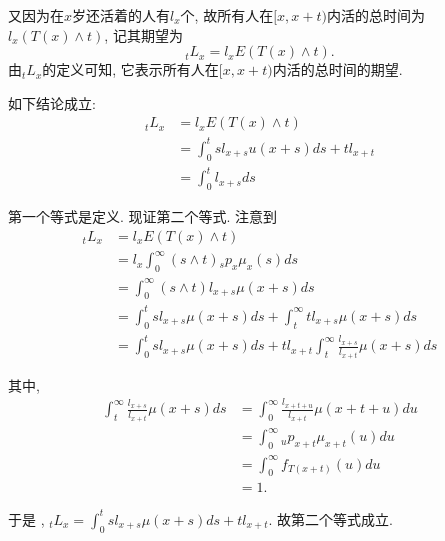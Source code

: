 \documentclass[a4paper,openany, 10pt]{ctexbook}
\begin{document}
又因为在$x$岁还活着的人有$l_x$个, 故所有人在$[x,x+t)$内活的总时间为$l_x(T(x)\wedge t)$, 记其期望为$$ {}_tL_x=l_xE(T(x)\wedge t).$$
由${}_tL_x$的定义可知, 它表示所有人在$[x,x+t)$内活的总时间的期望.
\begin{proposition} 如下结论成立:
    \begin{align*}
        {}_tL_x & =l_xE(T(x)\wedge t)                 \\
                & =\int_0^t sl_{x+s}u(x+s)ds+tl_{x+t} \\
                & =\int_0^tl_{x+s}ds
    \end{align*}
\end{proposition}
\proof 第一个等式是定义. 现证第二个等式. 注意到
\begin{align*}
    {}_tL_x & =l_xE(T(x)\wedge t)                                                                  \\
            & =l_x\int_0^{\infty} (s\wedge t){}_sp_x\mu_x(s)ds                                     \\
            & =\int_0^{\infty}(s\wedge t)l_{x+s}\mu(x+s)ds                                         \\
            & =\int_0^tsl_{x+s}\mu(x+s)ds+\int_t^{\infty}tl_{x+s}\mu(x+s)ds                        \\
            & =\int_0^tsl_{x+s}\mu(x+s)ds+tl_{x+t}\int_t^{\infty}\frac{l_{x+s}}{l_{x+t}}\mu(x+s)ds
\end{align*}

其中,\begin{align*}
    \int_t^{\infty}\frac{l_{x+s}}{l_{x+t}}\mu(x+s)ds
     & =\int_0^{\infty}\frac{l_{x+t+u}}{l_{x+t}}\mu(x+t+u)du \\
     & =\int_0^{\infty}{}_up_{x+t}\mu_{x+t}(u)du             \\
     & =\int_0^{\infty}f_{T{(x+t)}}(u)du                     \\
     & =1.
\end{align*}

于是 , ${}_tL_x=\int_0^tsl_{x+s}\mu(x+s)ds+tl_{x+t}.$ 故第二个等式成立.
\end{document}
